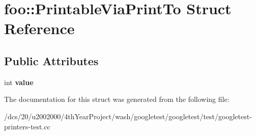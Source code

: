 \hypertarget{structfoo_1_1PrintableViaPrintTo}{}\section{foo\+:\+:Printable\+Via\+Print\+To Struct Reference}
\label{structfoo_1_1PrintableViaPrintTo}
\subsection*{Public Attributes}
\begin{DoxyCompactItemize}
\item 
\mbox{\label{structfoo_1_1PrintableViaPrintTo_a16f8c6420275d86f0d0112ca5a41bca2}} 
int {\bfseries value}
\end{DoxyCompactItemize}


The documentation for this struct was generated from the following file\+:\begin{DoxyCompactItemize}
\item 
/dcs/20/u2002000/4th\+Year\+Project/wash/googletest/googletest/test/googletest-\/printers-\/test.\+cc\end{DoxyCompactItemize}
